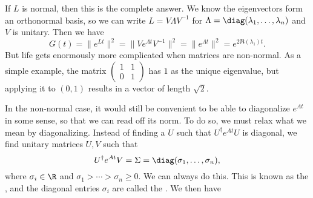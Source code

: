 \documentclass[a4paper]{article}
\begin{document}
If $L$ is normal, then this is the complete answer. We know the eigenvectors form an orthonormal basis, so we can write $L = V \Lambda V^{-1}$ for $\Lambda = \diag(\lambda_1,\ldots, \lambda_n)$ and $V$ is unitary. Then we have
\[
  G(t) = \|e^{Lt}\|^2 = \|V e^{\Lambda t} V^{-1}\|^2 = \|e^{\Lambda t}\|^2 = e^{2 \Re (\lambda_1) t}.
\]
But life gets enormously more complicated when matrices are non-normal. As a simple example, the matrix $\begin{pmatrix} 1 & 1\\ 0 & 1 \end{pmatrix}$ has $1$ as the unique eigenvalue, but applying it to $(0, 1)$ results in a vector of length $\sqrt{2}$.

In the non-normal case, it would still be convenient to be able to diagonalize $e^{At}$ in some sense, so that we can read off its norm. To do so, we must relax what we mean by diagonalizing. Instead of finding a $U$ such that $U^\dagger e^{At} U$ is diagonal, we find unitary matrices $U, V$ such that
\[
  U^\dagger e^{At} V = \Sigma = \diag(\sigma_1, \ldots, \sigma_n),
\]
where $\sigma_i \in \R$ and $\sigma_1 > \cdots > \sigma_n \geq 0$. We can always do this. This is known as the , and the diagonal entries $\sigma_i$ are called the . We then have
%
\end{document}
